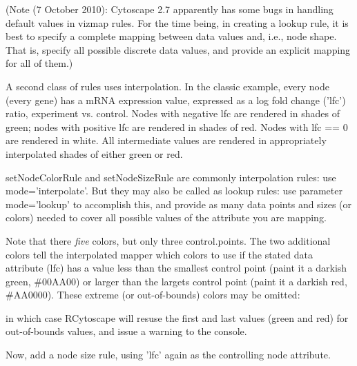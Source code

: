 \documentclass[12pt]{article}
\begin{document}
(Note (7 October 2010):  Cytoscape 2.7 apparently has some bugs in handling default values in vizmap rules.  For the time being, in creating a lookup rule, it is best to specify a complete mapping between data values and, i.e., node shape.  That is, specify all possible discrete data values, and provide an explicit mapping for all of them.)

A second class of rules uses interpolation.  In the classic example, every node (every gene) has a mRNA expression
value, expressed as a log fold change ('lfc') ratio, experiment vs. control.  Nodes with negative lfc are rendered in
shades of green; nodes with positive lfc are rendered in shades of red.  Nodes with lfc == 0 are rendered in white.  All
intermediate values are rendered in appropriately interpolated shades of either green or red.

setNodeColorRule and setNodeSizeRule are commonly interpolation rules: use mode='interpolate'.  But they may also be called as lookup rules:  use parameter mode='lookup' to accomplish this, and provide as many data points and sizes (or colors) needed to cover all possible values of the attribute you are mapping.

\begin{Schunk}
\end{Schunk}
Note that there \emph{five} colors, but only three control.points.  The two additional colors tell the interpolated mapper which colors to use if the stated data attribute (lfc) has a value less than the smallest control point (paint it a darkish green, \#00AA00) or larger than the largets control point (paint it a darkish red, \#AA0000).  These extreme (or out-of-bounds) colors may be omitted:

\begin{Schunk}
\end{Schunk}

in which case RCytoscape will resuse the first and last values (green and red) for out-of-bounds values, and issue a warning to the console.

Now, add a node size rule, using 'lfc' again as the controlling node attribute.
\end{document}
